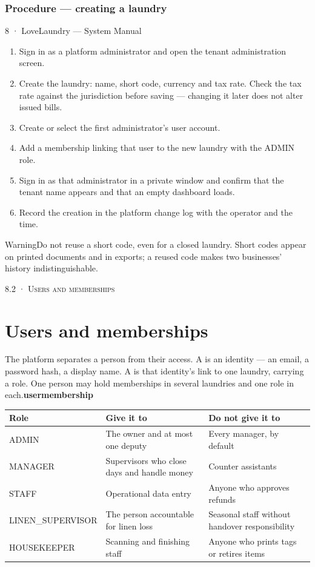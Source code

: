 \documentclass[11pt,a4paper,oneside]{book}
\begin{document}
\subsubsection*{Procedure — creating a laundry}
8 · LoveLaundry — System Manual

\begin{enumerate}
\item Sign in as a platform administrator and open the tenant administration screen.
\item Create the laundry: name, short code, currency and tax rate. Check the tax rate against the jurisdiction before saving — changing it later does not alter issued bills.
\item Create or select the first administrator's user account.
\item Add a membership linking that user to the new laundry with the ADMIN role.
\item Sign in as that administrator in a private window and confirm that the tenant name appears and that an empty dashboard loads.
\item Record the creation in the platform change log with the operator and the time.
\end{enumerate}
\begin{notebox}WarningDo not reuse a short code, even for a closed laundry. Short codes appear on printed documents and in exports; a reused code makes two businesses' history indistinguishable.\end{notebox}
\textsc{\small\color{crimson}8.2 · Users and memberships}\par\medskip
\section*{Users and memberships}
The platform separates a person from their access. A  is an identity — an email, a password hash, a display name. A  is that identity's link to one laundry, carrying a role. One person may hold memberships in several laundries and one role in each.\textbf{user}\textbf{membership}

\begin{center}\small
\begin{tabularx}{\linewidth}{|X|X|X|}
\hline
\rowcolor{lightgrey}
\textbf{Role} & \textbf{Give it to} & \textbf{Do not give it to} \\ \hline
ADMIN & The owner and at most one deputy & Every manager, by default \\ \hline
MANAGER & Supervisors who close days and handle money & Counter assistants \\ \hline
STAFF & Operational data entry & Anyone who approves refunds \\ \hline
LINEN\_SUPERVISOR & The person accountable for linen loss & Seasonal staff without handover responsibility \\ \hline
HOUSEKEEPER & Scanning and finishing staff & Anyone who prints tags or retires items \\ \hline
\end{tabularx}
\end{center}
\end{document}
